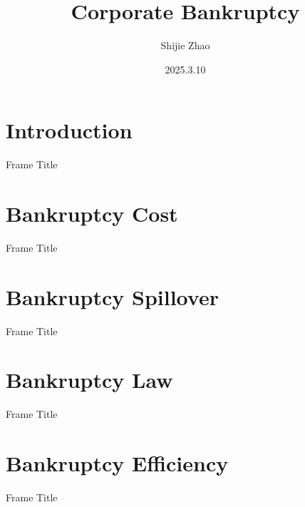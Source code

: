 \documentclass[aspectratio=169]{beamer}
\title{Corporate Bankruptcy}
\author{Shijie Zhao}
\institute{Peking University HSBC Business School}
\date{2025.3.10}
\begin{document}
\frame{\titlepage}
\section{Introduction}
\begin{frame}{Frame Title}
    
\end{frame}

\section{Bankruptcy Cost}
\begin{frame}{Frame Title}
    
\end{frame}

\section{Bankruptcy Spillover}
\begin{frame}{Frame Title}
    
\end{frame}

\section{Bankruptcy Law}
\begin{frame}{Frame Title}
    
\end{frame}

\section{Bankruptcy Efficiency}
\begin{frame}{Frame Title}
    
\end{frame}
\end{document}

